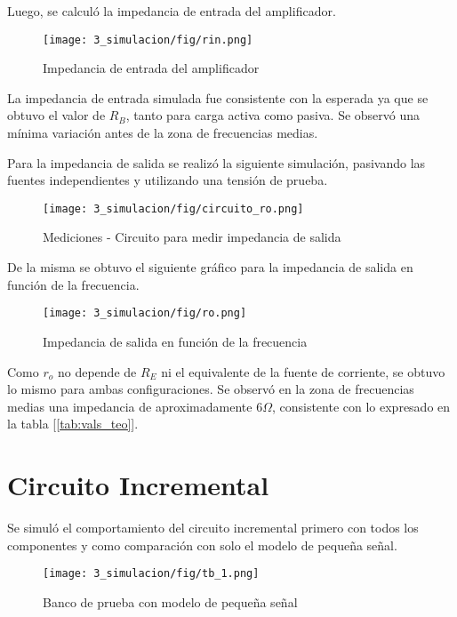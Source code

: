 Luego, se calculó la impedancia de entrada del amplificador.
\begin{figure}[H]
    \centering
    \texttt{[image: 3\_simulacion/fig/rin.png]}
    \label{mediciones_pol_activa}
    \caption{Impedancia de entrada del amplificador}
\end{figure}

La impedancia de entrada simulada fue consistente con la esperada ya que se obtuvo el valor de $R_B$,
tanto para carga activa como pasiva. Se observó una mínima variación antes de la zona de frecuencias medias. \par 


Para la impedancia de salida se realizó la siguiente simulación, pasivando las fuentes independientes 
y utilizando una tensión de prueba.

\begin{figure}[H]
    \centering
    \texttt{[image: 3\_simulacion/fig/circuito\_ro.png]}
    \label{mediciones_pol_activa}
    \caption{Mediciones - Circuito para medir impedancia de salida}
\end{figure}

De la misma se obtuvo el siguiente gráfico para la impedancia de salida en función de la frecuencia.

\begin{figure}[H]
    \centering
    \texttt{[image: 3\_simulacion/fig/ro.png]}
    \label{mediciones_pol_activa}
    \caption{Impedancia de salida en función de la frecuencia}
\end{figure}

Como $r_o$ no depende de $R_E$ ni el equivalente de la fuente de corriente, se obtuvo lo mismo para ambas 
configuraciones. Se observó en la zona de frecuencias medias una impedancia de aproximadamente $6 \Omega$, 
consistente con lo expresado en la tabla [\ref{tab:vals_teo}].



\newpage
\section{Circuito Incremental}
Se simuló el comportamiento del circuito incremental primero con todos los componentes y como comparación con solo el modelo de pequeña señal.

\begin{figure}[ht]
    \centering
    \texttt{[image: 3\_simulacion/fig/tb\_1.png]}
    \caption{Banco de prueba con modelo de pequeña señal}
\end{figure}

